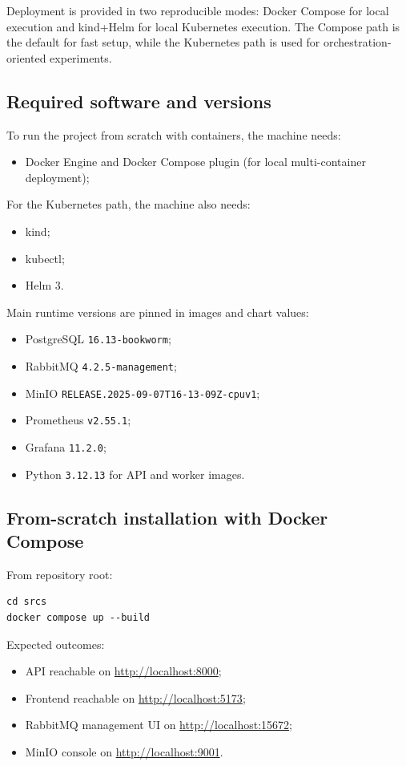 \documentclass{scrartcl}
\begin{document}
Deployment is provided in two reproducible modes: Docker Compose for local execution and kind+Helm for local Kubernetes execution.
The Compose path is the default for fast setup, while the Kubernetes path is used for orchestration-oriented experiments.

\subsection*{Required software and versions}

To run the project from scratch with containers, the machine needs:
\begin{itemize}
  \item Docker Engine and Docker Compose plugin (for local multi-container deployment);
\end{itemize}

For the Kubernetes path, the machine also needs:
\begin{itemize}
  \item kind;
  \item kubectl;
  \item Helm 3.
\end{itemize}

Main runtime versions are pinned in images and chart values:
\begin{itemize}
  \item PostgreSQL \texttt{16.13-bookworm};
  \item RabbitMQ \texttt{4.2.5-management};
  \item MinIO \texttt{RELEASE.2025-09-07T16-13-09Z-cpuv1};
  \item Prometheus \texttt{v2.55.1};
  \item Grafana \texttt{11.2.0};
  \item Python \texttt{3.12.13} for API and worker images.
\end{itemize}

\subsection*{From-scratch installation with Docker Compose}

From repository root:
\begin{verbatim}
cd srcs
docker compose up --build
\end{verbatim}

Expected outcomes:
\begin{itemize}
  \item API reachable on \url{http://localhost:8000};
  \item Frontend reachable on \url{http://localhost:5173};
  \item RabbitMQ management UI on \url{http://localhost:15672};
  \item MinIO console on \url{http://localhost:9001}.
\end{itemize}
\end{document}
